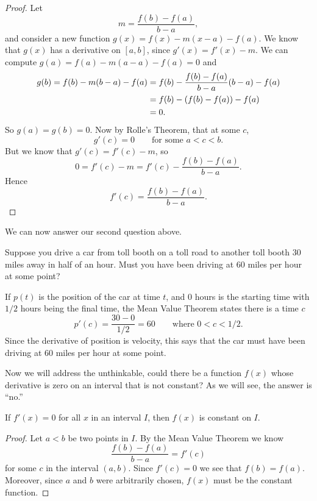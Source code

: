\begin{proof}
Let 
\[
m=\frac{f(b)-f(a)}{b-a},
\] 
and consider a new function $g(x)=f(x) - m(x-a)-f(a)$.  We know that
$g(x)$ has a derivative on $[a,b]$, since $g'(x)=f'(x)-m$. We can
compute $g(a)=f(a)- m(a-a)-f(a) =0$ and
\begin{align*}
g(b)=f(b)-m(b-a)-f(a)&=f(b)-{f(b)-f(a)\over b-a}(b-a)-f(a) \\
&=f(b)-(f(b)-f(a))-f(a)\\
&=0. 
\end{align*}
So $g(a) = g(b) = 0$. Now by Rolle's Theorem, that at some $c$,
\[
g'(c)=0\qquad\text{for some $a<c<b$}.
\]
But we know that $g'(c)=f'(c)-m$, so
\[
0=f'(c)-m=f'(c)-\frac{f(b)-f(a)}{b-a}.
\]
Hence
\[
f'(c)=\frac{f(b)-f(a)}{b-a}.
\]
\end{proof}

We can now answer our second question above.  

\begin{example}
Suppose you drive a car from toll booth on a toll road to another toll
booth $30$ miles away in half of an hour. Must you have been driving
at $60$ miles per hour at some point?
\end{example}

\begin{solution}
If $p(t)$ is the position of the car at time $t$, and $0$ hours is
the starting time with $1/2$ hours being the final time, the Mean Value Theorem states there is a time $c$
\[
p'(c) = \frac{30-0}{1/2} = 60\qquad \text{where $0<c<1/2$.}
\]
Since the derivative of position is velocity, this says that the car
must have been driving at $60$ miles per hour at some point.
\end{solution}

Now we will address the unthinkable, could there be a function $f(x)$
whose derivative is zero on an interval that is not constant? As we will
see, the answer is ``no.''

\begin{theorem} 
If $f'(x)=0$ for all $x$ in an interval $I$, then $f(x)$ is constant
on $I$.
\end{theorem}

\begin{proof}
Let $a< b$ be two points in $I$. By the Mean Value Theorem we know
\[
\frac{f(b)-f(a)}{b-a} = f'(c)
\]
for some $c$ in the interval $(a,b)$. Since $f'(c)=0$ we see that
$f(b)=f(a)$. Moreover, since $a$ and $b$ were arbitrarily chosen,
$f(x)$ must be the constant function.
\end{proof}

